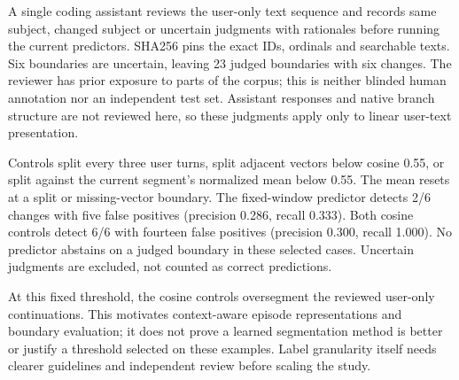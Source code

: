 \documentclass[11pt]{article}
\begin{document}
A single coding assistant reviews the user-only text sequence and records same
subject, changed subject or uncertain judgments with rationales before running
the current predictors. SHA256 pins the exact IDs, ordinals and searchable texts.
Six boundaries are uncertain, leaving 23 judged boundaries with six changes.
The reviewer has prior exposure to parts of the corpus; this is neither blinded
human annotation nor an independent test set. Assistant responses and native
branch structure are not reviewed here, so these judgments apply only to linear
user-text presentation.

Controls split every three user turns, split adjacent vectors below cosine 0.55,
or split against the current segment's normalized mean below 0.55. The mean resets
at a split or missing-vector boundary. The fixed-window predictor detects 2/6
changes with five false positives (precision 0.286, recall 0.333). Both cosine
controls detect 6/6 with fourteen false positives (precision 0.300, recall 1.000).
No predictor abstains on a judged boundary in these selected cases. Uncertain
judgments are excluded, not counted as correct predictions.

At this fixed threshold, the cosine controls oversegment the reviewed user-only
continuations. This motivates context-aware episode representations and boundary
evaluation; it does not prove a learned segmentation method is better or justify
a threshold selected on these examples. Label granularity itself needs clearer
guidelines and independent review before scaling the study.
\end{document}
